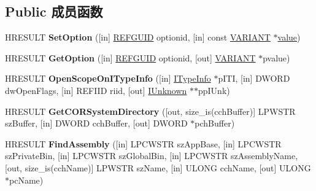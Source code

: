 \subsection*{Public 成员函数}
\begin{DoxyCompactItemize}
\item 
\mbox{\label{interface_i_meta_data_dispenser_ex_a65a5bf579352c66cc8fdf3852c8f3747}} 
H\+R\+E\+S\+U\+LT {\bfseries Set\+Option} (\mbox{[}in\mbox{]} \hyperlink{struct___g_u_i_d}{R\+E\+F\+G\+U\+ID} optionid, \mbox{[}in\mbox{]} const \hyperlink{structtag_v_a_r_i_a_n_t}{V\+A\+R\+I\+A\+NT} $\ast$\hyperlink{unionvalue}{value})
\item 
\mbox{\label{interface_i_meta_data_dispenser_ex_ad28ee3266007322e38dca9d5e9132e4e}} 
H\+R\+E\+S\+U\+LT {\bfseries Get\+Option} (\mbox{[}in\mbox{]} \hyperlink{struct___g_u_i_d}{R\+E\+F\+G\+U\+ID} optionid, \mbox{[}out\mbox{]} \hyperlink{structtag_v_a_r_i_a_n_t}{V\+A\+R\+I\+A\+NT} $\ast$pvalue)
\item 
\mbox{\label{interface_i_meta_data_dispenser_ex_a101794373d82651601238449359cc339}} 
H\+R\+E\+S\+U\+LT {\bfseries Open\+Scope\+On\+I\+Type\+Info} (\mbox{[}in\mbox{]} \hyperlink{interface_i_type_info}{I\+Type\+Info} $\ast$p\+I\+TI, \mbox{[}in\mbox{]} D\+W\+O\+RD dw\+Open\+Flags, \mbox{[}in\mbox{]} R\+E\+F\+I\+ID riid, \mbox{[}out\mbox{]} \hyperlink{interface_i_unknown}{I\+Unknown} $\ast$$\ast$pp\+I\+Unk)
\item 
\mbox{\label{interface_i_meta_data_dispenser_ex_a73731bdf027aa95b51badfa6247fc874}} 
H\+R\+E\+S\+U\+LT {\bfseries Get\+C\+O\+R\+System\+Directory} (\mbox{[}out, size\+\_\+is(cch\+Buffer)\mbox{]} L\+P\+W\+S\+TR sz\+Buffer, \mbox{[}in\mbox{]} D\+W\+O\+RD cch\+Buffer, \mbox{[}out\mbox{]} D\+W\+O\+RD $\ast$pch\+Buffer)
\item 
\mbox{\label{interface_i_meta_data_dispenser_ex_ab074ba25d503dc91b7ce69aa72033dfe}} 
H\+R\+E\+S\+U\+LT {\bfseries Find\+Assembly} (\mbox{[}in\mbox{]} L\+P\+C\+W\+S\+TR sz\+App\+Base, \mbox{[}in\mbox{]} L\+P\+C\+W\+S\+TR sz\+Private\+Bin, \mbox{[}in\mbox{]} L\+P\+C\+W\+S\+TR sz\+Global\+Bin, \mbox{[}in\mbox{]} L\+P\+C\+W\+S\+TR sz\+Assembly\+Name, \mbox{[}out, size\+\_\+is(cch\+Name)\mbox{]} L\+P\+W\+S\+TR sz\+Name, \mbox{[}in\mbox{]} U\+L\+O\+NG cch\+Name, \mbox{[}out\mbox{]} U\+L\+O\+NG $\ast$pc\+Name)
$$
\end{DoxyCompactItemize}
